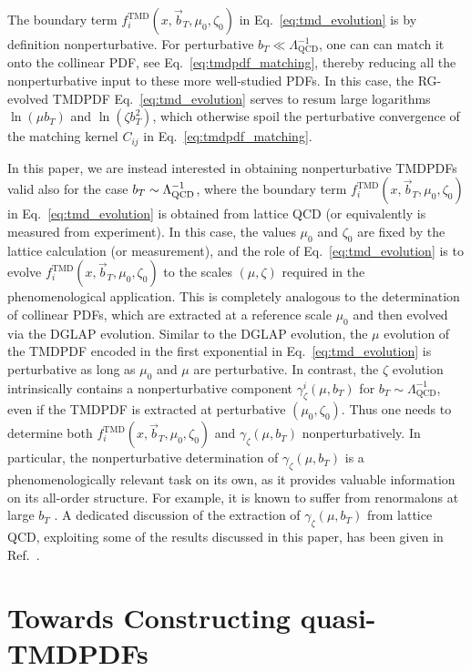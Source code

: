 \documentclass[11pt,a4paper]{article}
\DeclareRobustCommand{\eq}[1]{Eq.~\eqref{eq:#1}}
\DeclareRobustCommand{\mycite}[1]{Ref.~\cite{#1}}
\newcommand{\LQCD}{\Lambda_\mathrm{QCD}}
\newcommand\TMD{\mathrm{TMD}}
\newcommand{\bt}{\vec b_T}
\begin{document}
The boundary term $f_i^\TMD(x,\bt,\mu_0,\zeta_0)$ in \eq{tmd_evolution} is by definition nonperturbative.
For perturbative $b_T \ll \LQCD^{-1}$, one can can match it onto the collinear PDF, see \eq{tmdpdf_matching},
thereby reducing all the nonperturbative input to these more well-studied PDFs.
In this case, the RG-evolved TMDPDF \eq{tmd_evolution} serves to resum large logarithms $\ln(\mu b_T)$ and $\ln(\zeta b_T^2)$, which otherwise spoil the perturbative convergence of the matching kernel $C_{ij}$ in \eq{tmdpdf_matching}.

In this paper, we are instead interested in obtaining nonperturbative TMDPDFs valid also for the case $b_T\sim \Lambda_{\rm QCD}^{-1}$,
where the boundary term $f_i^\TMD(x,\bt,\mu_0,\zeta_0)$ in \eq{tmd_evolution} is obtained from lattice QCD
(or equivalently is measured from experiment).
In this case, the values $\mu_0$ and $\zeta_0$ are fixed by the lattice calculation (or measurement),
and the role of \eq{tmd_evolution} is to evolve $f_i^\TMD(x,\bt,\mu_0,\zeta_0)$ to the scales $(\mu,\zeta)$ required in the phenomenological application.
This is completely analogous to the determination of collinear PDFs, which are extracted at a reference scale $\mu_0$ and then evolved via the DGLAP evolution.
Similar to the DGLAP evolution, the $\mu$ evolution of the TMDPDF encoded in the first exponential in \eq{tmd_evolution} is perturbative as long as $\mu_0$ and $\mu$ are perturbative.
In contrast, the $\zeta$ evolution intrinsically contains a nonperturbative component $\gamma_\zeta^i(\mu,b_T)$ for $b_T \sim \LQCD^{-1}$,
even if the TMDPDF is extracted at perturbative $(\mu_0,\zeta_0)$.
Thus one needs to determine both $f_i^\TMD(x,\bt,\mu_0,\zeta_0)$ and $\gamma_\zeta(\mu, b_T)$ nonperturbatively.
In particular, the nonperturbative determination of $\gamma_\zeta(\mu,b_T)$ is a phenomenologically relevant task on its own, as it provides valuable information on its all-order structure.
For example, it is known to suffer from renormalons at large $b_T$ \cite{Scimemi:2016ffw}.
A dedicated discussion of the extraction of $\gamma_\zeta(\mu, b_T)$ from lattice QCD, exploiting some of the results discussed in this paper, has been given in \mycite{Ebert:2018gzl}.


\section{Towards Constructing quasi-TMDPDFs}
\label{sec:towards_qtmd}
\end{document}
